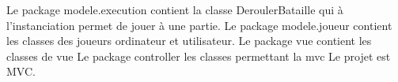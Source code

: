 \documentclass[12pt]{article}
\begin{document}
Le package modele.execution contient la classe DeroulerBataille qui à l'instanciation permet de jouer à une partie.
Le package modele.joueur contient les classes des joueurs ordinateur et utilisateur.
Le package vue contient les classes de vue
Le package controller les classes permettant la mvc
Le projet est MVC.
\end{document}
